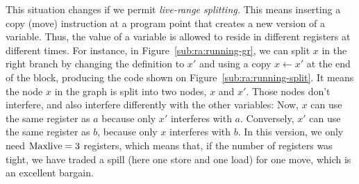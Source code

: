 {


This situation changes if we permit \emph{live-range splitting.} 
This means inserting a copy (move) instruction at a program point that creates a new version of a variable. 
Thus, the value of a variable is allowed to reside in different registers at 
different times.  For instance, in Figure~\ref{sub:ra:running-gr}, we 
can split $x$ in the right branch by changing the definition to $x'$ and using 
a copy $x \gets x'$ at the end of the block, producing the code shown on Figure~\ref{sub:ra:running-split}.
It means the node $x$ in the graph is split into two nodes, $x$ and $x'$.
Those nodes don't interfere, and also interfere differently with the other variables:
Now, $x$ can use the same register as $a$ because only $x'$ interferes with $a$.
Conversely, $x'$ can use the same register as $b$, because only $x$ interferes with $b$.
In this version, we only need $\mathrm{Maxlive} = 3$ registers, which means that, if the number of registers was tight, we have traded a spill (here one store and one load) for one move, which is an excellent bargain.


}

